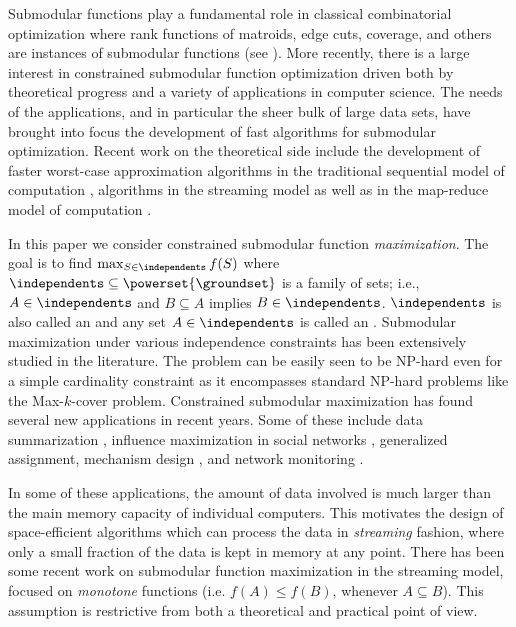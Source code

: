 \documentclass[oneside,letterpaper]{scrartcl} \usepackage{macros}
\begin{document}
Submodular functions play a fundamental role in classical
combinatorial optimization where rank functions of matroids, edge
cuts, coverage, and others are instances of submodular functions (see
\cite{Schrijver_book,Fujishige_book}). More recently, there is a large
interest in constrained submodular function optimization driven both
by theoretical progress and a variety of applications in computer
science. The needs of the applications, and in particular the sheer
bulk of large data sets, have brought into focus the development of
fast algorithms for submodular optimization. Recent work on the
theoretical side include the development of faster worst-case
approximation algorithms in the traditional sequential model of
computation \cite{bv-famsf-14,ijbICML-13,ChekuriTV15}, algorithms in
the streaming model \cite{bmkk-sso-14,ck-smms-14} as well as in the
map-reduce model of computation \cite{kmvv-13}.




In this paper we consider constrained submodular function
\emph{maximization}. The goal is to find $\max_{S \in \independents}
f(S)$ where $\independents \subseteq \powerset{\groundset}$ is a
 family of sets; i.e., $A \in \independents$
and $B \subseteq A$ implies $B \in \independents$. $\independents$ is
also called an  and any set $A \in
\independents$ is called an . Submodular
maximization under various independence constraints has been
extensively studied in the literature. The problem can be easily seen
to be NP-hard even for a simple cardinality constraint as it
encompasses standard NP-hard problems like the Max-$k$-cover
problem. Constrained submodular maximization has found several new
applications in recent years. Some of these include data summarization
\cite{hb-11,sssj-12,dkr-13}, influence maximization in social networks
\cite{kkt-03,cyy-09,ccy-10,gfl-11,ss-13}, generalized
assignment\cite{ccpv-07}, mechanism design \cite{bik-07}, and network
monitoring \cite{lkgfvg-07}.

In some of these applications, the amount of data involved is much
larger than the main memory capacity of individual computers. This
motivates the design of space-efficient algorithms which can process
the data in \textit{streaming} fashion, where only a small fraction of
the data is kept in memory at any point. There has been some recent
work on submodular function maximization in the streaming model,
focused on \emph{monotone} functions (i.e. $f(A) \leq f(B)$, whenever
$A \subseteq B$). This assumption is restrictive from both a
theoretical and practical point of view.
\end{document}
